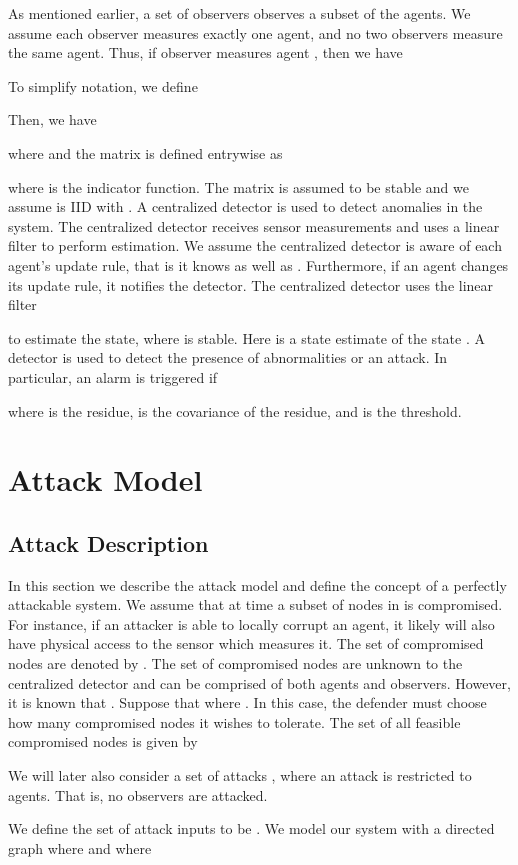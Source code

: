 \documentclass[letterpaper, 10 pt, conference]{ieeeconf}
\begin{document}
As mentioned earlier, a set of observers  observes a subset of the agents. We assume each observer measures exactly one agent, and no two observers measure the same agent. Thus, if observer  measures agent , then we have

To simplify notation, we define

Then, we have 

where  and the matrix  is defined entrywise as

where  is the indicator function. The matrix  is assumed to be stable and we assume  is IID with . A centralized detector is used to detect anomalies in the system. The centralized detector receives sensor measurements and uses a linear filter to perform estimation. We assume the centralized detector is aware of each agent's update rule, that is it knows  as well as . Furthermore, if an agent changes its update rule, it notifies the detector. The centralized detector uses the linear filter 

to estimate the state, where  is stable. Here  is a state estimate of the state . A  detector is used to detect the presence of abnormalities or an attack. In particular, an alarm is triggered if 

where  is the residue,  is the covariance of the residue, and  is the threshold.
\section{Attack Model}
\subsection{Attack Description}
In this section we describe the attack model and define the concept of a perfectly attackable system. We assume that at time  a subset of nodes in  is compromised. For instance, if an attacker is able to locally corrupt an agent, it likely will also have physical access to the sensor which measures it. The set of compromised nodes are denoted by . The set of compromised nodes are unknown to the centralized detector and can be comprised of both agents and observers. However, it is known that . Suppose that  where . In this case, the defender must choose how many compromised nodes it wishes to tolerate.
The set of all feasible compromised nodes is given by

We will later also consider a set of attacks , where an attack is restricted to agents. That is, no observers are attacked.
 
 We define the set of attack inputs to be . We model our system with a directed graph  where  and  where 
\end{document}
